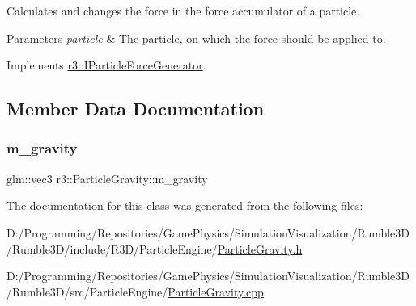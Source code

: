 Calculates and changes the force in the force accumulator of a particle. 


\begin{DoxyParams}{Parameters}
{\em particle} & The particle, on which the force should be applied to. \\
\hline
\end{DoxyParams}


Implements \mbox{\hyperlink{classr3_1_1_i_particle_force_generator_af705063c5d7debca0f7a5c5c68c28f50}{r3\+::\+I\+Particle\+Force\+Generator}}.



\subsection{Member Data Documentation}
\mbox{\label{classr3_1_1_particle_gravity_a4e21b444ed08aa8c66ca40a11f34c384}} 
\subsubsection{\texorpdfstring{m\+\_\+gravity}{m\_gravity}}
{\footnotesize\ttfamily glm\+::vec3 r3\+::\+Particle\+Gravity\+::m\+\_\+gravity\hspace{0.3cm}{\ttfamily [protected]}}



The documentation for this class was generated from the following files\+:\begin{DoxyCompactItemize}
\item 
D\+:/\+Programming/\+Repositories/\+Game\+Physics/\+Simulation\+Visualization/\+Rumble3\+D/\+Rumble3\+D/include/\+R3\+D/\+Particle\+Engine/\mbox{\hyperlink{_particle_gravity_8h}{Particle\+Gravity.\+h}}\item 
D\+:/\+Programming/\+Repositories/\+Game\+Physics/\+Simulation\+Visualization/\+Rumble3\+D/\+Rumble3\+D/src/\+Particle\+Engine/\mbox{\hyperlink{_particle_gravity_8cpp}{Particle\+Gravity.\+cpp}}\end{DoxyCompactItemize}
